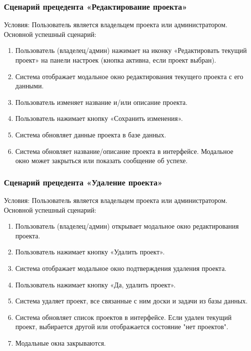 \subsubsection{Сценарий прецедента «Редактирование проекта»}
Условия: Пользователь является владельцем проекта или администратором.
Основной успешный сценарий:
\begin{enumerate}
	\item Пользователь (владелец/админ) нажимает на иконку «Редактировать текущий проект» на панели настроек (кнопка активна, если проект выбран).
	\item Система отображает модальное окно редактирования текущего проекта с его данными.
	\item Пользователь изменяет название и/или описание проекта.
	\item Пользователь нажимает кнопку «Сохранить изменения».
	\item Система обновляет данные проекта в базе данных.
	\item Система обновляет название/описание проекта в интерфейсе. Модальное окно может закрыться или показать сообщение об успехе.
\end{enumerate}

\subsubsection{Сценарий прецедента «Удаление проекта»}
Условия: Пользователь является владельцем проекта или администратором.
Основной успешный сценарий:
\begin{enumerate}
	\item Пользователь (владелец/админ) открывает модальное окно редактирования проекта.
	\item Пользователь нажимает кнопку «Удалить проект».
	\item Система отображает модальное окно подтверждения удаления проекта.
	\item Пользователь нажимает кнопку «Да, удалить проект».
	\item Система удаляет проект, все связанные с ним доски и задачи из базы данных.
	\item Система обновляет список проектов в интерфейсе. Если удален текущий проект, выбирается другой или отображается состояние "нет проектов".
	\item Модальные окна закрываются.
\end{enumerate}

